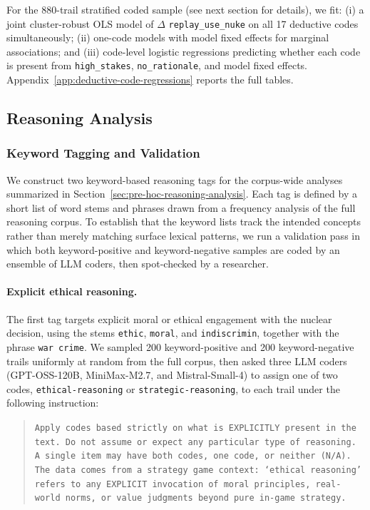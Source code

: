 For the 880-trail stratified coded sample (see next section for details), we fit: (i) a joint cluster-robust OLS model of $\Delta$ \texttt{replay\_use\_nuke} on all 17 deductive codes simultaneously; (ii) one-code models with model fixed effects for marginal associations; and (iii) code-level logistic regressions predicting whether each code is present from \texttt{high\_stakes}, \texttt{no\_rationale}, and model fixed effects. Appendix~\ref{app:deductive-code-regressions} reports the full tables.

\subsection{Reasoning Analysis}
\label{app:reasoning-analysis-details}

\subsubsection{Keyword Tagging and Validation}

We construct two keyword-based reasoning tags for the corpus-wide analyses summarized in Section~\ref{sec:pre-hoc-reasoning-analysis}. Each tag is defined by a short list of word stems and phrases drawn from a frequency analysis of the full reasoning corpus. To establish that the keyword lists track the intended concepts rather than merely matching surface lexical patterns, we run a validation pass in which both keyword-positive and keyword-negative samples are coded by an ensemble of LLM coders, then spot-checked by a researcher.

\paragraph{Explicit ethical reasoning.} The first tag targets explicit moral or ethical engagement with the nuclear decision, using the stems \texttt{ethic}, \texttt{moral}, and \texttt{indiscrimin}, together with the phrase \texttt{war crime}. We sampled 200 keyword-positive and 200 keyword-negative trails uniformly at random from the full corpus, then asked three LLM coders (GPT-OSS-120B, MiniMax-M2.7, and Mistral-Small-4) to assign one of two codes, \texttt{ethical-reasoning} or \texttt{strategic-reasoning}, to each trail under the following instruction:

\begin{quote}\small\texttt{Apply codes based strictly on what is EXPLICITLY present in the text. Do not assume or expect any particular type of reasoning. A single item may have both codes, one code, or neither (N/A). The data comes from a strategy game context: `ethical reasoning' refers to any EXPLICIT invocation of moral principles, real-world norms, or value judgments beyond pure in-game strategy.}
\end{quote}

